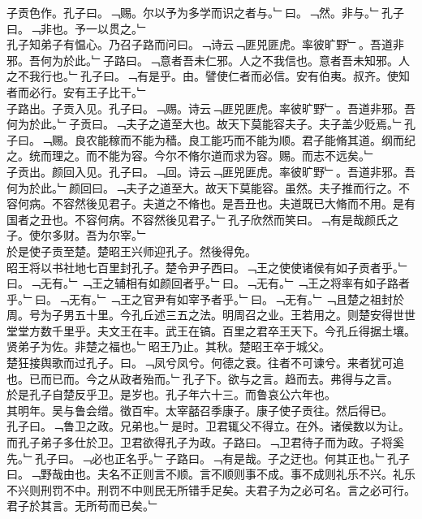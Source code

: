 \documentclass{zhvt-classic}
\begin{document}
\hspace*{2em}子贡色作。孔子曰。﹁赐。尔以予为多学而识之者与。﹂曰。﹁然。非与。﹂孔子曰。﹁非也。予一以贯之。﹂\\
\hspace*{2em}孔子知弟子有愠心。乃召子路而问曰。﹁诗云﹁匪兕匪虎。率彼旷野﹂。吾道非邪。吾何为於此。﹂子路曰。﹁意者吾未仁邪。人之不我信也。意者吾未知邪。人之不我行也。﹂孔子曰。﹁有是乎。由。譬使仁者而必信。安有伯夷。叔齐。使知者而必行。安有王子比干。﹂\\
\hspace*{2em}子路出。子贡入见。孔子曰。﹁赐。诗云﹁匪兕匪虎。率彼旷野﹂。吾道非邪。吾何为於此。﹂子贡曰。﹁夫子之道至大也。故天下莫能容夫子。夫子盖少贬焉。﹂孔子曰。﹁赐。良农能稼而不能为穑。良工能巧而不能为顺。君子能脩其道。纲而纪之。统而理之。而不能为容。今尔不脩尔道而求为容。赐。而志不远矣。﹂\\
\hspace*{2em}子贡出。颜回入见。孔子曰。﹁回。诗云﹁匪兕匪虎。率彼旷野﹂。吾道非邪。吾何为於此。﹂颜回曰。﹁夫子之道至大。故天下莫能容。虽然。夫子推而行之。不容何病。不容然後见君子。夫道之不脩也。是吾丑也。夫道既已大脩而不用。是有国者之丑也。不容何病。不容然後见君子。﹂孔子欣然而笑曰。﹁有是哉颜氏之子。使尔多财。吾为尔宰。﹂\\
\hspace*{2em}於是使子贡至楚。楚昭王兴师迎孔子。然後得免。\\
\hspace*{2em}昭王将以书社地七百里封孔子。楚令尹子西曰。﹁王之使使诸侯有如子贡者乎。﹂曰。﹁无有。﹂﹁王之辅相有如颜回者乎。﹂曰。﹁无有。﹂﹁王之将率有如子路者乎。﹂曰。﹁无有。﹂﹁王之官尹有如宰予者乎。﹂曰。﹁无有。﹂﹁且楚之祖封於周。号为子男五十里。今孔丘述三五之法。明周召之业。王若用之。则楚安得世世堂堂方数千里乎。夫文王在丰。武王在镐。百里之君卒王天下。今孔丘得据土壤。贤弟子为佐。非楚之福也。﹂昭王乃止。其秋。楚昭王卒于城父。\\
\hspace*{2em}楚狂接舆歌而过孔子。曰。﹁凤兮凤兮。何德之衰。往者不可谏兮。来者犹可追也。已而已而。今之从政者殆而。﹂孔子下。欲与之言。趋而去。弗得与之言。\\
\hspace*{2em}於是孔子自楚反乎卫。是岁也。孔子年六十三。而鲁哀公六年也。\\
\hspace*{2em}其明年。吴与鲁会缯。徵百牢。太宰嚭召季康子。康子使子贡往。然后得已。\\
\hspace*{2em}孔子曰。﹁鲁卫之政。兄弟也。﹂是时。卫君辄父不得立。在外。诸侯数以为让。而孔子弟子多仕於卫。卫君欲得孔子为政。子路曰。﹁卫君待子而为政。子将奚先。﹂孔子曰。﹁必也正名乎。﹂子路曰。﹁有是哉。子之迂也。何其正也。﹂孔子曰。﹁野哉由也。夫名不正则言不顺。言不顺则事不成。事不成则礼乐不兴。礼乐不兴则刑罚不中。刑罚不中则民无所错手足矣。夫君子为之必可名。言之必可行。君子於其言。无所苟而已矣。﹂\\
\end{document}
